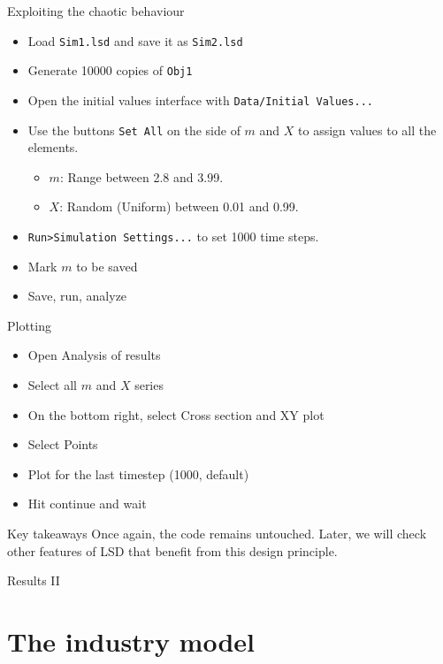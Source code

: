 \documentclass[bigger,aspectratio=169]{beamer}
\begin{document}
\begin{frame}[label={sec:org1a24bdb},fragile]{Exploiting the chaotic behaviour}
 \begin{itemize}
\item Load \texttt{Sim1.lsd} and save it as \texttt{Sim2.lsd}
\item Generate \alert{10000} copies of \texttt{Obj1}
\item Open the initial values interface with \texttt{Data/Initial Values...}
\item Use the buttons \texttt{Set All} on the side of \(m\) and \(X\) to assign values to all the elements.
\begin{itemize}
\item \(m\): \alert{Range} between 2.8 and 3.99.
\item \(X\): Random (Uniform) between 0.01 and 0.99.
\end{itemize}
\item \texttt{Run>Simulation Settings...} to set 1000 time steps.
\item Mark \(m\) to be saved
\item Save, run, analyze
\end{itemize}
\end{frame}
\begin{frame}[label={sec:org5ff225a}]{Plotting}
\begin{itemize}
\item Open Analysis of results
\item Select all \(m\) and \(X\) series
\item On the bottom right, select \alert{Cross section} and \alert{XY plot}
\item Select \alert{Points}
\item Plot for the last timestep (1000, default)
\item Hit continue and wait
\end{itemize}
\begin{block}{Key takeaways}
Once again, the code remains \alert{untouched}.
Later, we will check other features of LSD that benefit from this design principle.
\end{block}
\end{frame}
\begin{frame}[label={sec:orgdc073e0}]{Results II}
\begin{center}

\end{center}
\end{frame}
\section{The industry model}
\label{sec:orgb5a99b8}
\end{document}
